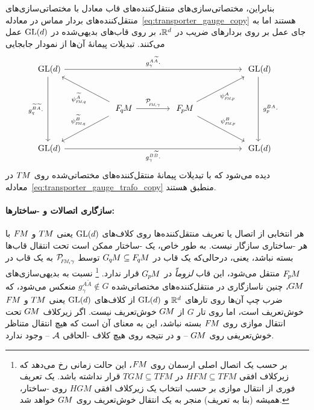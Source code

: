 بنابراین، مختصاتی‌سازی‌های منتقل‌کننده‌های قاب معادل با مختصاتی‌سازی‌های منتقل‌کننده‌های بردار مماس در معادله~\eqref{eq:transporter_gauge_copy} هستند اما به جای عمل بر روی بردارهای ضریب در $\mathbb{R}^{d}$، بر روی قاب‌های بدیهی‌شده در $\operatorname{GL}(d)$ عمل می‌کنند.
تبدیلات پیمانۀ آن‌ها از نمودار جابجایی
\begin{equation}\label{cd:FM_transport_trivialization}
	\begin{tikzcd}[column sep=53pt, row sep=30, font=\normalsize]
		\GL{d}
		\arrow[dd, "g_q^{\widetilde{B}\widetilde{A}}\cdot\ "']
		\arrow[rrr, "g_\gamma^{A\widetilde{A}}\cdot"]
		& &[-3ex] &
		\GL{d}
		\arrow[dd, "\ g_p^{BA}\cdot"]
		\\
		&
		\FqM
		\arrow[ul, "\psiFMq^{\widetilde{A}}", pos=.45]
		\arrow[dl, "\psiFMq^{\widetilde{B}}"', pos=.45]
		\arrow[r, "\PFMgamma"]
		&
		\FpM
		\arrow[ur, "\psiFMp^A"', pos=.45]
		\arrow[dr, "\psiFMp^B", pos=.45]
		\\
		\GL{d}
		\arrow[rrr, "g_\gamma^{B\widetilde{B}}\cdot"']
		& & &
		\GL{d}
	\end{tikzcd}
	\quad
\end{equation}
دیده می‌شود که با تبدیلات پیمانۀ منتقل‌کننده‌های مختصاتی‌شده روی $T\mkern-1.5muM$ در معادله~\eqref{eq:transporter_gauge_trafo_copy} منطبق هستند.





\paragraph{سازگاری اتصالات و -ساختارها:}

هر انتخابی از اتصال یا تعریف منتقل‌کننده‌ها روی کلاف‌های $\operatorname{GL}(d)$ یعنی $T\mkern-1.5muM$ و $F\mkern-1.5muM$ با هر -ساختاری سازگار نیست.
به طور خاص، یک -ساختار ممکن است تحت انتقال قاب‌ها بسته نباشد، یعنی،
درحالی‌که یک قاب در $G_{\mkern-1.3mu q}\mkern-1.3muM \subseteq F_{\mkern-1.5mu q}\mkern-1.1muM$ توسط $\PFMgamma$ به یک قاب در $F_{\mkern-1.5mu p}\mkern-1.0muM$ منتقل می‌شود، این قاب \emph{لزوماً} در $G_{\mkern-1.3mu p}\mkern-1.2muM$ قرار ندارد.%
\footnote{
	بر حسب یک اتصال اصلی ارسمان روی $F\mkern-1.5muM$، این حالت زمانی رخ می‌دهد که زیرکلاف افقی $HFM \subseteq TFM$ در $TGM \subseteq TFM$ قرار نداشته باشد.
	یک تعریف فوری از انتقال موازی بر حسب انتخاب یک زیرکلاف افقی $HGM$ روی -ساختار، همیشه (بنا به تعریف) منجر به یک انتقال خوش‌تعریف روی $G\mkern-1.4muM$ خواهد شد.
}
نسبت به بدیهی‌سازی‌های $G\mkern-1.4muM$، چنین ناسازگاری در منتقل‌کننده‌های مختصاتی‌شده ${g_\gamma^{A\widetilde{A}} \notin G}$ منعکس می‌شود، که ضرب چپ آن‌ها روی تارهای $\mathbb{R}^d$ و $\operatorname{GL}(d)$ از کلاف‌های $\operatorname{GL}(d)$ یعنی $T\mkern-1.5muM$ و $F\mkern-1.5muM$ خوش‌تعریف است، اما روی تار $G$ از $G\mkern-1.4muM$ خوش‌تعریف نیست.
اگر زیرکلاف $G\mkern-1.4muM$ تحت انتقال موازی روی $F\mkern-1.5muM$ بسته نباشد، این به معنای آن است که هیچ انتقال متناظر خوش‌تعریفی روی $G\mkern-1.4muM$ -- و در نتیجه روی هیچ کلاف -الحاقی $\mathcal{A}$ -- وجود ندارد.

